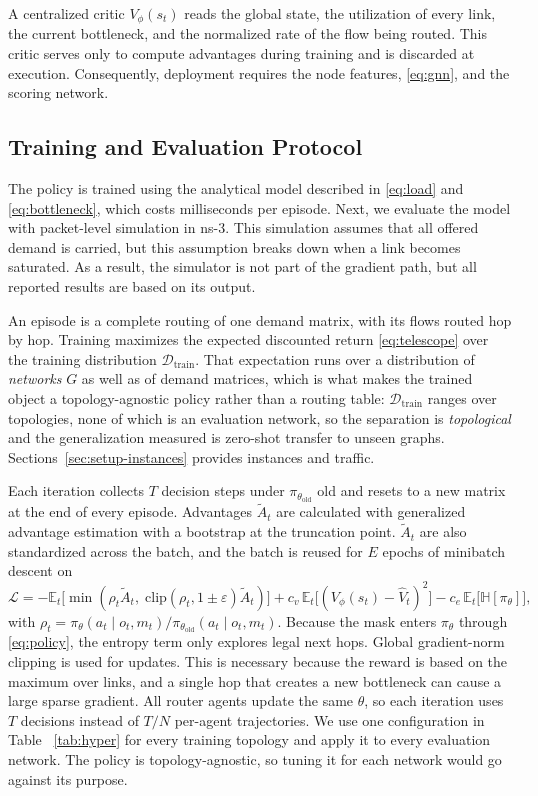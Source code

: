 A centralized critic $V_\phi(s_t)$ reads the global state, the utilization of
every link, the current bottleneck, and the normalized rate of the flow being
routed. This critic serves only to compute advantages during training and is discarded at execution. Consequently, deployment requires the node features, \eqref{eq:gnn}, and the scoring network. 

\subsection{Training and Evaluation Protocol}
\label{sec:method-protocol}
The policy is trained using the analytical model described in \eqref{eq:load} and \eqref{eq:bottleneck}, which costs milliseconds per episode. Next, we evaluate the model with packet-level simulation in ns-3. This simulation assumes that all offered demand is carried, but this assumption breaks down when a link becomes saturated. As a result, the simulator is not part of the gradient path, but all reported results are based on its output.

An episode is a complete routing of one demand matrix, with its flows routed hop by hop. Training maximizes the expected discounted return \eqref{eq:telescope} over the training distribution $\mathcal{D}_{\mathrm{train}}$. That expectation runs over a distribution of \emph{networks} $G$ as well as of demand matrices, which is what makes the trained object a topology-agnostic policy rather than a routing table: $\mathcal{D}_{\mathrm{train}}$ ranges over topologies, none of which is an evaluation network, so the separation is \emph{topological} and the generalization measured is zero-shot transfer to unseen graphs. Sections~\ref{sec:setup-instances} provides instances and traffic.

Each iteration collects $T$ decision steps under $\pi_{\theta_{\mathrm{old}}}$ old and resets to a new matrix at the end of every episode. Advantages $\tilde{A}_t$ are calculated with generalized advantage estimation \citep{schulman2016gae} with a bootstrap at the truncation point. $\tilde{A}_t$  are also standardized across the batch, and the batch is reused for $E$ epochs of minibatch descent on 
\begin{equation}\label{eq:loss}
\mathcal{L}=-\mathbb{E}_t\bigl[\min(\rho_t\tilde{A}_t,\;
\mathrm{clip}(\rho_t,1{\pm}\varepsilon)\tilde{A}_t)\bigr]
+c_v\,\mathbb{E}_t\bigl[(V_\phi(s_t)-\hat{V}_t)^2\bigr]
-c_e\,\mathbb{E}_t\bigl[\mathbb{H}[\pi_\theta]\bigr],
\end{equation}
with $\rho_t=\pi_\theta(a_t\mid o_t,m_t)/\pi_{\theta_{\mathrm{old}}}(a_t\mid o_t,m_t)$. Because the mask enters $\pi_\theta$ through \eqref{eq:policy}, the entropy term only explores legal next hops. Global gradient-norm clipping is used for updates. This is necessary because the reward is based on the maximum over links, and a single hop that creates a new bottleneck can cause a large sparse gradient. All router agents update the same $\theta$, so each iteration uses $T$ decisions instead of $T/N$ per-agent trajectories. We use one configuration in  Table ~\ref{tab:hyper} for every training topology and apply it to every evaluation network. The policy is topology-agnostic, so tuning it for each network would go against its purpose.

